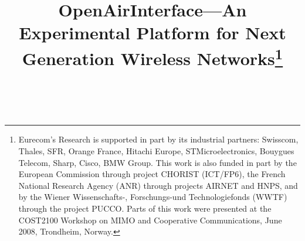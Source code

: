 \documentclass[a4paper,twocolumn,journal]{IEEEtran}
\begin{document}
\title{OpenAirInterface---An Experimental Platform for Next Generation Wireless Networks\thanks{Eurecom's Research is supported in part by its industrial partners: Swisscom, Thales, SFR, Orange France, Hitachi Europe, STMicroelectronics, Bouygues Telecom, Sharp, Cisco, BMW Group. This work is also funded in part by the European Commission through project CHORIST (ICT/FP6), the French National Research Agency (ANR) through projects AIRNET and HNPS, and by the  Wiener Wissenschafts-, Forschungs-und Technologiefonds (WWTF) through the project PUCCO. Parts of this work were presented at the COST2100 Workshop on MIMO and Cooperative Communications, June 2008, Trondheim, Norway.}}

\author{\\
}

\maketitle
\end{document}
